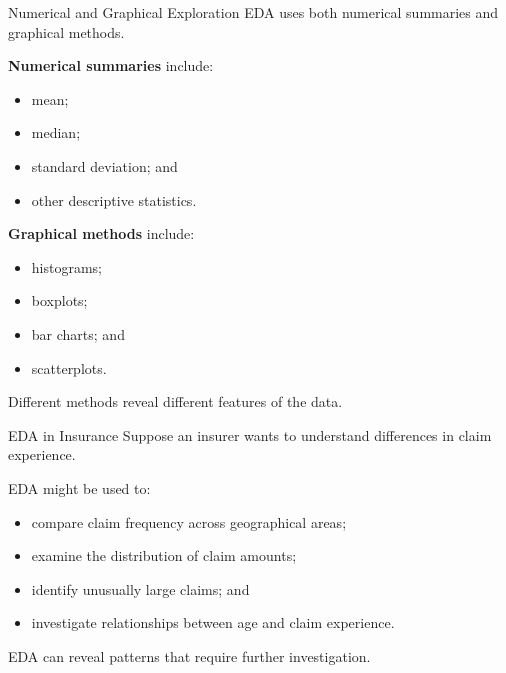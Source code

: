 \documentclass[
  ignorenonframetext,
  aspectratio=169,
]{beamer}
\providecommand{\tightlist}{%
  \setlength{\itemsep}{0pt}\setlength{\parskip}{0pt}}
\begin{document}
\begin{frame}{Numerical and Graphical Exploration}
\protect{}\label{numerical-and-graphical-exploration}
EDA uses both numerical summaries and graphical methods.

\textbf{Numerical summaries} include:

\begin{itemize}
\tightlist
\item
  mean;
\item
  median;
\item
  standard deviation; and
\item
  other descriptive statistics.
\end{itemize}

\textbf{Graphical methods} include:

\begin{itemize}
\tightlist
\item
  histograms;
\item
  boxplots;
\item
  bar charts; and
\item
  scatterplots.
\end{itemize}

Different methods reveal different features of the data.
\end{frame}

\begin{frame}{EDA in Insurance}
\protect{}\label{eda-in-insurance}
Suppose an insurer wants to understand differences in claim experience.

EDA might be used to:

\begin{itemize}
\tightlist
\item
  compare claim frequency across geographical areas;
\item
  examine the distribution of claim amounts;
\item
  identify unusually large claims; and
\item
  investigate relationships between age and claim experience.
\end{itemize}

EDA can reveal patterns that require further investigation.
\end{frame}
\end{document}
